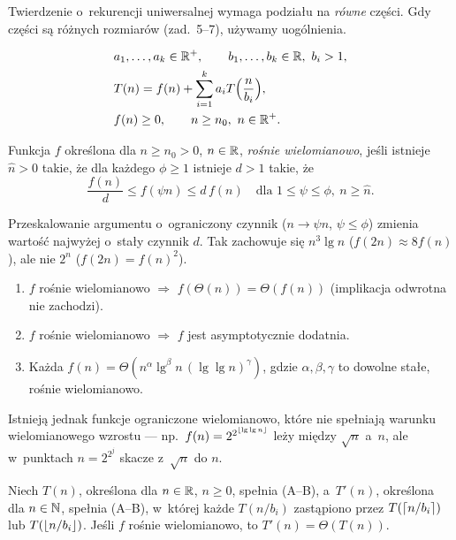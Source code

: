 \documentclass[11pt]{article}
\begin{document}
Twierdzenie o~rekurencji uniwersalnej wymaga podziału na \emph{równe} części.
Gdy części są różnych rozmiarów (zad.~5--7), używamy uogólnienia.

\begin{definicja}
\begin{align*}
&a_1,\dots,a_k\in\mathbb{R}^+,\qquad b_1,\dots,b_k\in\mathbb{R},\ b_i>1,\\
&T(n)=f(n)+\sum_{i=1}^ka_iT\Bigl(\frac n{b_i}\Bigr),\\
&f(n)\ge0,\qquad n\ge n_0,\ n\in\mathbb{R}^+.
\end{align*}
\end{definicja}

\begin{definicja}
Funkcja $f$ określona dla $n\ge n_0>0$, $n\in\mathbb{R}$, \emph{rośnie
wielomianowo}, jeśli istnieje $\hat n>0$ takie, że dla każdego $\phi\ge1$
istnieje $d>1$ takie, że
\[
\frac{f(n)}d\le f(\psi n)\le d\,f(n)\quad\text{dla } 1\le\psi\le\phi,\ n\ge\hat n.
\]
\end{definicja}

\begin{intuicja}
Przeskalowanie argumentu o~ograniczony czynnik ($n\to\psi n$, $\psi\le\phi$)
zmienia wartość najwyżej o~stały czynnik $d$. Tak zachowuje się
$n^3\lg n$ ($f(2n)\approx8f(n)$), ale nie $2^n$ ($f(2n)=f(n)^2$).
\end{intuicja}

\begin{fakt}[z wykładu]\label{fakt:wielom}
\begin{enumerate}
\item $f$ rośnie wielomianowo $\Rightarrow$ $f(\Theta(n))=\Theta(f(n))$
(implikacja odwrotna nie zachodzi).
\item $f$ rośnie wielomianowo $\Rightarrow$ $f$ jest asymptotycznie dodatnia.
\item Każda $f(n)=\Theta(n^\alpha\lg^\beta n\,(\lg\lg n)^\gamma)$, gdzie
$\alpha,\beta,\gamma$ to dowolne stałe, rośnie wielomianowo.
\end{enumerate}
Istnieją jednak funkcje ograniczone wielomianowo, które nie spełniają
warunku wielomianowego wzrostu --- np.\ $f(n)=2^{2^{\left\lfloor \operatorname{lg}\operatorname{lg} n \right\rfloor}}$
leży między $\sqrt n$ a~$n$, ale w~punktach $n=2^{2^j}$ skacze
z~$\sqrt n$ do $n$.
\end{fakt}

\begin{twierdzenie}\label{tw:akra-sufity}
Niech $T(n)$, określona dla $n\in\mathbb{R}$, $n\ge0$, spełnia (A--B), a~$T'(n)$,
określona dla $n\in\mathbb{N}$, spełnia (A--B), w~której każde $T(n/b_i)$ zastąpiono
przez $T(\left\lceil n/b_i \right\rceil)$ lub $T(\left\lfloor n/b_i \right\rfloor)$. Jeśli $f$ rośnie
wielomianowo, to $T'(n)=\Theta(T(n))$.
\end{twierdzenie}
\end{document}
